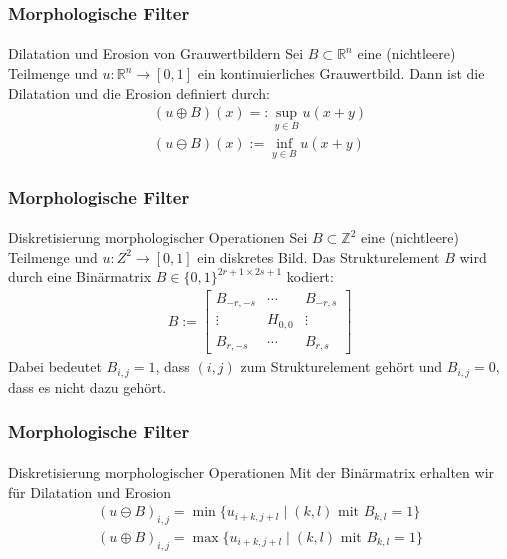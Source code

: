 \documentclass{beamer}
\begin{document}
\begin{frame}
    \frametitle{Morphologische Filter}
\framesubtitle{}

\begin{block}{Dilatation und Erosion von Grauwertbildern}
Sei $B \subset \mathbb{R}^n$ eine (nichtleere) Teilmenge und $u : \mathbb{R}^n \to [ 0,1 ]$ ein kontinuierliches Grauwertbild. Dann ist die Dilatation und die Erosion definiert durch:
\begin{align*}
(u \oplus B)(x) =: \sup_{y \in B} u(x +y) \\
(u \ominus B)(x) := \inf_{y \in B} u(x +y)
\end{align*}
\end{block}

 \end{frame}


\begin{frame}
    \frametitle{Morphologische Filter}
\framesubtitle{}

\begin{block}{Diskretisierung morphologischer Operationen}
Sei $B \subset \mathbb{Z}^2$ eine (nichtleere) Teilmenge und $u : Z^2 \to [0,1]$  ein diskretes  Bild. Das Strukturelement $B$ wird durch eine Binärmatrix $B \in \{ 0,1 \}^{2r +1 \times 2s +1}$ kodiert:
\begin{align*}
B := \begin{bmatrix} 
    B_{-r, -s} & \cdots  & B_{-r, s} \\
     \vdots & H_{0, 0} & \vdots						\\
	B_{r, -s} & \cdots & B_{r, s} 
\end{bmatrix}\end{align*}
Dabei bedeutet $B_{i,j} =1$, dass $(i,j)$ zum Strukturelement gehört und  $B_{i,j} =0$, dass es nicht dazu gehört. 
\end{block}

 \end{frame}


\begin{frame}
    \frametitle{Morphologische Filter}
\framesubtitle{}

\begin{block}{Diskretisierung morphologischer Operationen}
Mit der Binärmatrix erhalten wir für Dilatation und Erosion
\begin{align*}
(u \ominus B)_{i,j} = \min \{ u_{i+k, j+l}  \; | \;  (k,l) \text{ mit } B_{k,l} = 1\} \\
(u \oplus B)_{i,j}  =\max \{ u_{i+k, j+l}  \; | \;  (k,l) \text{ mit } B_{k,l} = 1\} 
\end{align*}

\end{block}

 \end{frame}
\end{document}
